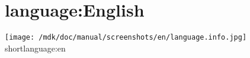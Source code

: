 \section{language:English}
\texttt{[image: /mdk/doc/manual/screenshots/en/language.info.jpg]} \\
 shortlanguage:en 

